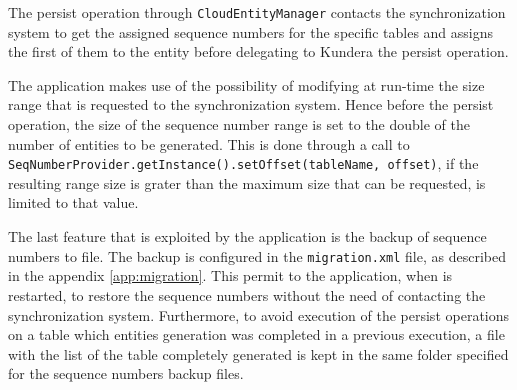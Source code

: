 \noindent The persist operation through \texttt{CloudEntityManager} contacts the synchronization system to get the assigned sequence numbers for the specific tables and assigns the first of them to the entity before delegating to Kundera the persist operation.

\newparagraph The application makes use of the possibility of modifying at run-time the size range that is requested to the synchronization system. Hence before the persist operation, the size of the sequence number range is set to the double of the number of entities to be generated. This is done through a call to \texttt{SeqNumberProvider.getInstance().setOffset(tableName, offset)}, if the resulting range size is grater than the maximum size that can be requested, is limited to that value. 

\newparagraph The last feature that is exploited by the application is the backup of sequence numbers to file. The backup is configured in the \texttt{migration.xml} file, as described in the appendix \ref{app:migration}.
This permit to the application, when is restarted, to restore the sequence numbers without the need of contacting the synchronization system. Furthermore, to avoid execution of the persist operations on a table which entities generation was completed in a previous execution, a file with the list of the table completely generated is kept in the same folder specified for the sequence numbers backup files.
